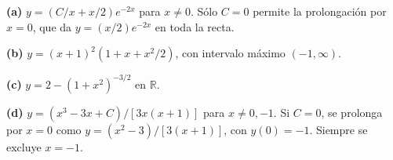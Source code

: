 \noindent\textbf{(a)} $y=(C/x+x/2)e^{-2x}$ para $x\ne0$. Sólo $C=0$ permite la prolongación por $x=0$, que da $y=(x/2)e^{-2x}$ en toda la recta.

\noindent\textbf{(b)} $y=(x+1)^2(1+x+x^2/2)$, con intervalo máximo $(-1,\infty)$.

\noindent\textbf{(c)} $y=2-(1+x^2)^{-3/2}$ en $\mathbb R$.

\noindent\textbf{(d)} $y=(x^3-3x+C)/[3x(x+1)]$ para $x\ne0,-1$. Si $C=0$, se prolonga por $x=0$ como $y=(x^2-3)/[3(x+1)]$, con $y(0)=-1$. Siempre se excluye $x=-1$.
